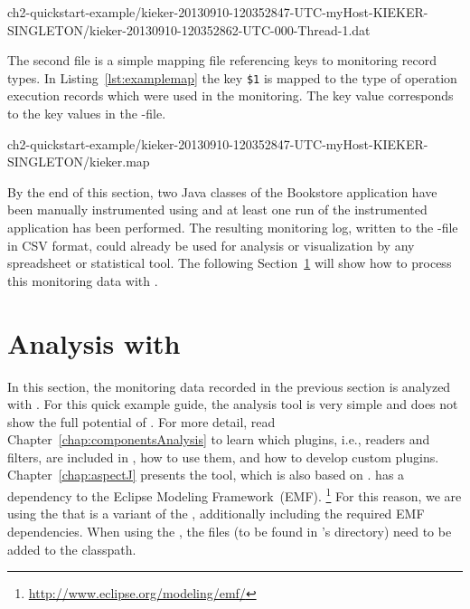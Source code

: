 \setBashListing
%
{ch2-quickstart-example/kieker-20130910-120352847-UTC-myHost-KIEKER-SINGLETON/kieker-20130910-120352862-UTC-000-Thread-1.dat}

\noindent The second file is a simple mapping file referencing keys to monitoring record types. In Listing~\ref{lst:examplemap} the key \verb!$1! is mapped to the type of operation execution records which were used in the monitoring. The key value corresponds to the key values in the -file.

%
{ch2-quickstart-example/kieker-20130910-120352847-UTC-myHost-KIEKER-SINGLETON/kieker.map}

\noindent By the end of this section, two Java classes of the Bookstore application %
have been manually instrumented using \KiekerMonitoringPart{} and at least one %
run of the instrumented application has been performed. %
The resulting monitoring log, written to the -file in CSV format, could %
already be used for analysis or visualization by any spreadsheet or %
statistical tool. %
The following Section~\ref{sec:example:analysis} will show how to process %
this monitoring data with \KiekerAnalysisPart{}.

\section{Analysis with \KiekerAnalysisPart{}}\label{sec:example:analysis}

In this section, the monitoring data recorded in the previous section is %
analyzed with \KiekerAnalysisPart{}. %
For this quick example guide, the analysis tool is very simple and does not show %
the full potential of \Kieker{}. For more detail, read %
Chapter~\ref{chap:componentsAnalysis} to learn which plugins, i.e., readers %
and filters, are included in \Kieker{}, how to use them, and how to develop %
custom plugins. %
Chapter~\ref{chap:aspectJ} presents the \KiekerTraceAnalysis{} tool, which %
is also based on \KiekerAnalysisPart{}.
\KiekerAnalysisPart{} has a dependency to the Eclipse Modeling Framework~(EMF).%
\footnote{\url{http://www.eclipse.org/modeling/emf/}} %
For this reason, we are using the \file{\mainJarEMF{}} that is a variant of %
the \file{\mainJar{}}, additionally including the required EMF dependencies. %
When using the \file{\mainJar{}}, the  files (to %
be found in \Kieker's  directory) need to be added to the classpath. %

